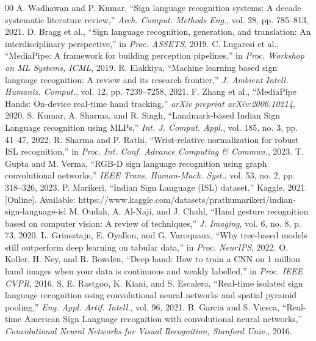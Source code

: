 \documentclass[conference]{IEEEtran}
\begin{document}
\begin{thebibliography}{00}
 A. Wadhawan and P. Kumar, ``Sign language recognition systems: A decade systematic literature review,'' \textit{Arch. Comput. Methods Eng.}, vol. 28, pp. 785--813, 2021.
 D. Bragg et al., ``Sign language recognition, generation, and translation: An interdisciplinary perspective,'' in \textit{Proc. ASSETS}, 2019.
 C. Lugaresi et al., ``MediaPipe: A framework for building perception pipelines,'' in \textit{Proc. Workshop on ML Systems, ICML}, 2019.
 R. Elakkiya, ``Machine learning based sign language recognition: A review and its research frontier,'' \textit{J. Ambient Intell. Humaniz. Comput.}, vol. 12, pp. 7239--7258, 2021.
 F. Zhang et al., ``MediaPipe Hands: On-device real-time hand tracking,'' \textit{arXiv preprint arXiv:2006.10214}, 2020.
 S. Kumar, A. Sharma, and R. Singh, ``Landmark-based Indian Sign Language recognition using MLPs,'' \textit{Int. J. Comput. Appl.}, vol. 185, no. 3, pp. 41--47, 2022.
 R. Sharma and P. Rathi, ``Wrist-relative normalization for robust ISL recognition,'' in \textit{Proc. Int. Conf. Advance Computing \& Commun.}, 2023.
 T. Gupta and M. Verma, ``RGB-D sign language recognition using graph convolutional networks,'' \textit{IEEE Trans. Human-Mach. Syst.}, vol. 53, no. 2, pp. 318--326, 2023.
 P. Marikeri, ``Indian Sign Language (ISL) dataset,'' Kaggle, 2021. [Online]. Available: https://www.kaggle.com/datasets/prathumarikeri/indian-sign-language-isl
 M. Oudah, A. Al-Naji, and J. Chahl, ``Hand gesture recognition based on computer vision: A review of techniques,'' \textit{J. Imaging}, vol. 6, no. 8, p. 73, 2020.
 L. Grinsztajn, E. Oyallon, and G. Varoquaux, ``Why tree-based models still outperform deep learning on tabular data,'' in \textit{Proc. NeurIPS}, 2022.
 O. Koller, H. Ney, and R. Bowden, ``Deep hand: How to train a CNN on 1 million hand images when your data is continuous and weakly labelled,'' in \textit{Proc. IEEE CVPR}, 2016.
 S. E. Rastgoo, K. Kiani, and S. Escalera, ``Real-time isolated sign language recognition using convolutional neural networks and spatial pyramid pooling,'' \textit{Eng. Appl. Artif. Intell.}, vol. 96, 2021.
 B. Garcia and S. Viesca, ``Real-time American Sign Language recognition with convolutional neural networks,'' \textit{Convolutional Neural Networks for Visual Recognition, Stanford Univ.}, 2016.

\end{thebibliography}
\end{document}
